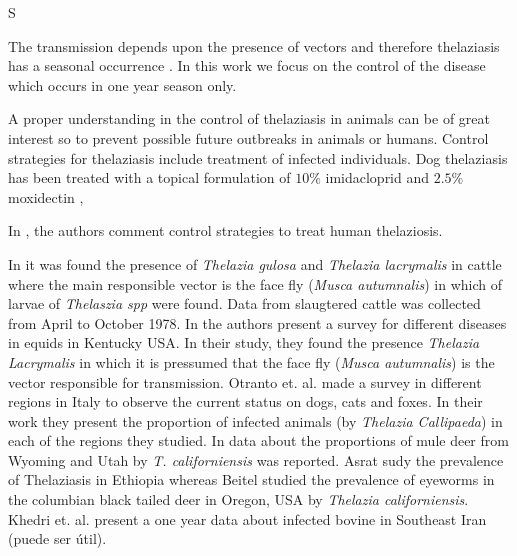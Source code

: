 S\documentclass[preprint,12pt]{elsarticle}
\begin{document}
\noindent The transmission depends upon the presence of vectors and therefore thelaziasis has a seasonal occurrence \cite{Asrat:2016}. In this work we focus on the control of the disease which occurs in one year season only.

\noindent A proper understanding in the control of thelaziasis in animals can be of great interest so to prevent possible future outbreaks in animals or humans. Control strategies for thelaziasis include treatment of infected individuals. Dog thelaziasis has been treated with a topical formulation of $10\%$ imidacloprid and $2.5\%$ moxidectin \cite{Bianciardi:2005},


In \cite{shen:2006}, the authors comment control strategies to treat human thelaziosis.






\noindent In \cite{Moolenbeek:1980} it was found the presence of \textit{Thelazia gulosa} and \textit{Thelazia lacrymalis} in cattle where the main responsible vector is the face fly (\textit{Musca autumnalis}) in which of larvae of \textit{Thelaszia spp} were found. Data from slaugtered cattle was collected from April to October 1978. In \cite{Lyons:2000} the authors present a survey for different diseases in equids in Kentucky USA. In their study, they found the presence \textit{Thelazia Lacrymalis} in which it is pressumed that the face fly (\textit{Musca autumnalis}) is the vector responsible for transmission. Otranto et. al. \cite{Otranto:2003} made a survey in different regions in Italy to observe the current status on dogs, cats and foxes. In their work they present the proportion of infected animals (by \textit{Thelazia Callipaeda}) in each of the regions they studied. In \cite{Dubay:2000} data about the proportions of mule deer from Wyoming and Utah by \textit{T. californiensis} was reported. Asrat \cite{Asrat:2016} sudy the prevalence of Thelaziasis in Ethiopia whereas Beitel \cite{Beitel:1974} studied the prevalence of eyeworms in the columbian black tailed deer in Oregon, USA by \textit{Thelazia californiensis}. Khedri et. al. \cite{Khedri:2016} present a one year data about infected bovine in Southeast Iran (puede ser útil).
\end{document}
